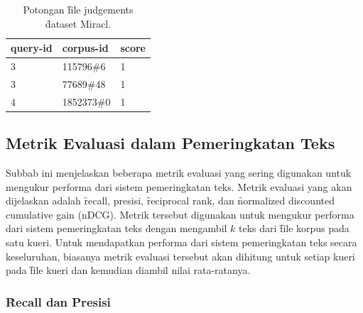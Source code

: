     \begin{table}[!ht]
        \centering
        \caption{Potongan \f{file} judgements \f{dataset} Miracl.}
        \label{tab:judgements-file-example}
        \begin{tabular}{|l|l|l|}
            \hline
            \textbf{query-id} & \textbf{corpus-id} & \textbf{score} \\ \hline
            3                 & 115796\#6          & 1              \\ \hline
            3                 & 77689\#48          & 1              \\ \hline
            4                 & 1852373\#0         & 1              \\ \hline
        \end{tabular}
    \end{table}
    


    \subsection{Metrik Evaluasi dalam Pemeringkatan Teks}
    \label{sec:metrik-evaluasi}
    Subbab ini menjelaskan beberapa metrik evaluasi yang sering digunakan untuk mengukur performa dari sistem pemeringkatan teks. Metrik evaluasi yang akan dijelaskan adalah \f{recall}, presisi, \f{reciprocal rank}, dan \f{normalized discounted cumulative gain} (nDCG). Metrik tersebut digunakan untuk mengukur performa dari sistem pemeringkatan teks dengan mengambil $k$ teks dari \f{file} korpus pada satu kueri. Untuk mendapatkan performa dari sistem pemeringkatan teks secara keseluruhan, biasanya metrik evaluasi tersebut akan dihitung untuk setiap kueri pada \f{file} kueri dan kemudian diambil nilai rata-ratanya.

    \subsubsection{\f{Recall} dan Presisi}

